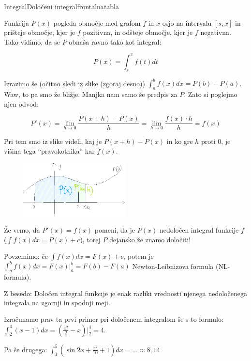 \begin{priprava}{}{}{Integral}{Določeni integral}{frontalna}{tabla}
\newpage

Funkcija $ P(x) $ pogleda območje med grafom $ f $ in $ x $-osjo na intervalu $ [ s, x] $  in prišteje območje, kjer je $ f $ pozitivna, in odšteje območje, kjer je $ f $ negativna. Tako vidimo, da se $ P $ obnaša ravno tako kot integral:

$$ P(x) = \int_s^x f(t) dt $$

Izrazimo še (očitno sledi iz slike (zgoraj desno)) $ \int_a^b f(x) dx = P(b) - P(a) $. Waw, to pa smo že bližje. Manjka nam samo še predpis za $ P $. Zato si  poglejmo njen odvod:

$$
P'(x) = \lim_{h \rightarrow 0} \frac{P(x + h) - P(x)}{h} = \lim_{h \rightarrow 0} \frac{f(x) \cdot h}{h} = f(x)
$$

Pri tem smo iz slike videli, kaj je $ P(x + h) - P(x) $ in ko gre $ h $ proti 0, je višina tega ``pravokotnika'' kar $ f(x) $.

\begin{figure}[h]
    \centering
    \includegraphics[width=0.5\textwidth]{slike/NL_P(x)_P(x+h).png}
\end{figure}


Že vemo, da $ P'(x) = f(x) $ pomeni, da je $ P(x) $ nedoločen integral funkcije $ f $ ($ \int f(x) dx = P(x) + c $), torej $ P $ dejansko že znamo določiti!

Povzemimo: če \textcolor{rdeca}{$ \int f(x) dx = F(x) + c $}, potem je \textcolor{rdeca}{$\int_a^b f(x) dx = F(x)|_a^b = F(b) - F(a) $}  Newton-Leibnizova formula (NL-formula).

Z besedo: Določen integral funkcije je enak razliki vrednosti njenega nedoločenega integrala na zgornji in spodnji meji.

Izračunamo prav ta prvi primer pri določenem integralom še s to formulo: $ \int_2^4 (x - 1) dx = (\frac{x^2}{2} - x) |_2^4 = 4 $.

Pa še drugega: $ \int_1^5 (\sin{2x}+\frac{x^2}{10} + 1) dx = \ldots \approx 8,14 $



\end{priprava}
